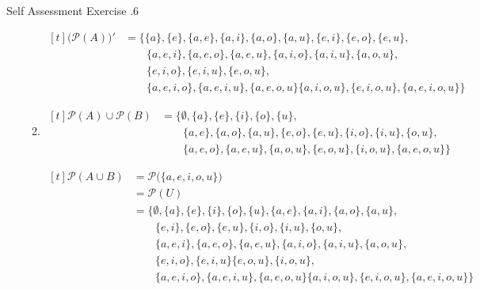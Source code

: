\documentclass[\main/notes.tex]{subfiles}
\begin{document}
\begin{exercise}{Self Assessment Exercise \thechapter.6}
\begin{enumerate}
\begin{enumerate}[label=(\alph*), labelsep=1em]
								$\begin{aligned}[t]
									\bigl(\mathcal{P}(A)\bigr)' &= \bigl\{\{a\}, \{e\}, \{a, e\}, \{a, i\}, \{a, o\}, \{a, u\}, \{e, i\}, \{e, o\}, \{e, u\},\\
									& \qquad \{a, e, i\}, \{a, e, o\}, \{a, e, u\}, \{a, i, o\}, \{a, i, u\}, \{a, o, u\}, \\
									& \qquad \{e, i, o\}, \{e, i, u\},  \{e, o, u\}, \\
									& \qquad \{a, e, i, o\}, \{a, e, i, u\}, \{a, e, o, u\} \{a, i, o, u\}, \{e, i, o, u\}, \{a, e, i, o, u\}\bigr\}
								\end{aligned} $
							\item $
								\begin{aligned}[t]
									\mathcal{P}(A) \cup \mathcal{P}(B) &= \bigl\{\emptyset, \{a\}, \{e\}, \{i\}, \{o\}, \{u\},\\
									& \qquad \{a, e\}, \{a, o\}, \{a, u\}, \{e, o\}, \{e, u\}, \{i, o\}, \{i, u\}, \{o, u\}, \\
									& \qquad \{a, e, o\}, \{a, e, u\}, \{a, o, u\}, \{e, o, u\}, \{i, o, u\}, \{a, e, o, u\}\bigr\}
								\end{aligned}$

								$\begin{aligned}[t]
									\mathcal{P}(A \cup B) &= \mathcal{P}\bigl(\{a, e, i, o, u\}\bigr)\\
									&= \mathcal{P}(U)\\
									&= \bigl\{\emptyset, \{a\}, \{e\}, \{i\}, \{o\}, \{u\}, \{a, e\}, \{a, i\}, \{a, o\}, \{a, u\},\\
									& \qquad \{e, i\}, \{e, o\}, \{e, u\}, \{i, o\}, \{i, u\}, \{o, u\},\\
									& \qquad \{a, e, i\}, \{a, e, o\}, \{a, e, u\}, \{a, i, o\}, \{a, i, u\}, \{a, o, u\},\\
									& \qquad \{e, i, o\}, \{e, i, u\} \{e, o, u\}, \{i, o, u\},\\
									& \qquad \{a, e, i, o\}, \{a, e, i, u\}, \{a, e, o, u\} \{a, i, o, u\}, \{e, i, o, u\}, \{a, e, i, o, u\}\bigr\}
								\end{aligned} $
						\end{enumerate}
				\end{enumerate}
			\end{exercise}
\end{document}

